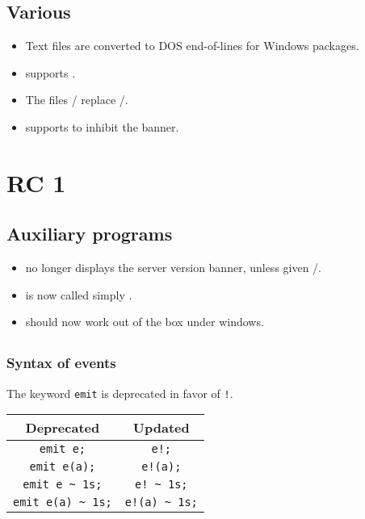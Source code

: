 \subsection{Various}

\begin{itemize}
\item Text files are converted to DOS end-of-lines for Windows packages.

\item {} supports .

\item The files / replace
  /.

\item {} supports  to inhibit the banner.
\end{itemize}

\section{ RC 1}

\subsection{Auxiliary programs}

\begin{itemize}
\item {} no longer displays the server version
  banner, unless given /.
\item {} is now called simply .
\item {} should now work out of the box under windows.
\end{itemize}


\subsection{\us}

\subsubsection{Syntax of events}

The keyword \lstinline|emit| is deprecated in favor of \lstinline|!|.

\begin{center}
  \begin{tabular}{|c|c|}
    \hline
    Deprecated & Updated \\
    \hline
    \lstinline|emit e;| &              \lstinline|e!;| \\
    \lstinline|emit e(a);| &           \lstinline|e!(a);| \\
    \lstinline|emit e ~ 1s;| &         \lstinline|e! ~ 1s;| \\
    \lstinline|emit e(a) ~ 1s;| &      \lstinline|e!(a) ~ 1s;| \\
    \hline
  \end{tabular}
\end{center}

